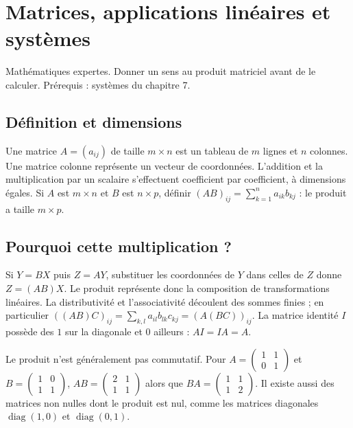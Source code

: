 \documentclass[../cours_tle.tex]{subfiles}
\begin{document}
\setcounter{chapter}{31}
\chapter{Matrices, applications linéaires et systèmes}
\label{ch:32}
\begin{objectif}
Mathématiques expertes. Donner un sens au produit matriciel avant de le calculer. Prérequis : systèmes du chapitre 7.
\end{objectif}
\section{Définition et dimensions}
Une matrice $A=(a_{ij})$ de taille $m\times n$ est un tableau de $m$ lignes et $n$ colonnes. Une matrice colonne représente un vecteur de coordonnées.
L'addition et la multiplication par un scalaire s'effectuent coefficient par coefficient, à dimensions égales.
Si $A$ est $m\times n$ et $B$ est $n\times p$, définir
$(AB)_{ij}=\sum_{k=1}^n a_{ik}b_{kj}$ : le produit a taille $m\times p$.
\section{Pourquoi cette multiplication ?}
Si $Y=BX$ puis $Z=AY$, substituer les coordonnées de $Y$ dans celles de $Z$ donne $Z=(AB)X$. Le produit représente donc la composition de transformations linéaires.
La distributivité et l'associativité découlent des sommes finies ; en particulier
$((AB)C)_{ij}=\sum_{k,l}a_{il}b_{lk}c_{kj}=(A(BC))_{ij}$.
La matrice identité $I$ possède des $1$ sur la diagonale et $0$ ailleurs : $AI=IA=A$.

Le produit n'est généralement pas commutatif. Pour
$A=\begin{pmatrix}1&1\\0&1\end{pmatrix}$ et
$B=\begin{pmatrix}1&0\\1&1\end{pmatrix}$,
$AB=\begin{pmatrix}2&1\\1&1\end{pmatrix}$ alors que
$BA=\begin{pmatrix}1&1\\1&2\end{pmatrix}$.
Il existe aussi des matrices non nulles dont le produit est nul, comme les matrices diagonales $\operatorname{diag}(1,0)$ et $\operatorname{diag}(0,1)$.
\end{document}
